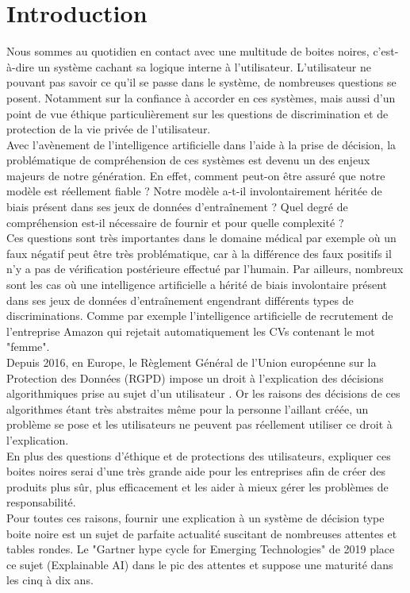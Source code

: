 \chapter*{Introduction}
\label{chap:introduction}
\vspace{5mm}
Nous sommes au quotidien en contact avec une multitude de boites noires, c’est-à-dire un système cachant sa logique interne à l’utilisateur. L’utilisateur ne pouvant pas savoir ce qu’il se passe dans le système, de nombreuses questions se posent. Notamment sur la confiance à accorder en ces systèmes, mais aussi d’un point de vue éthique particulièrement sur les questions de discrimination et de protection de la vie privée de l’utilisateur.\\

Avec l’avènement de l’intelligence artificielle dans l’aide à la prise de décision, la problématique de compréhension de ces systèmes est devenu un des enjeux majeurs de notre génération. En effet, comment peut-on être assuré que notre modèle est réellement fiable ? Notre modèle a-t-il involontairement héritée de biais présent dans ses jeux de données d'entraînement ? Quel degré de compréhension est-il nécessaire de fournir et pour quelle complexité ?\\
Ces questions sont très importantes dans le domaine médical par exemple où un faux négatif peut être très problématique, car à la différence des faux positifs il n'y a pas de vérification postérieure effectué par l'humain. Par ailleurs, nombreux sont les cas où une intelligence artificielle a hérité de biais involontaire présent dans ses jeux de données d'entraînement engendrant différents types de discriminations. Comme par exemple l'intelligence artificielle de recrutement de l'entreprise Amazon qui rejetait automatiquement les CVs contenant le mot "femme"\cite{amazonAi}.\\

Depuis 2016, en Europe, le Règlement Général de l'Union européenne sur la Protection des Données (RGPD) impose un droit à l'explication des décisions algorithmiques prise au sujet d'un utilisateur \cite{RGPDexplanRight}. Or les raisons des décisions de ces algorithmes étant très abstraites même pour la personne l'aillant créée, un problème se pose et les utilisateurs ne peuvent pas réellement utiliser ce droit à l'explication.\\

En plus des questions d'éthique et de protections des utilisateurs, expliquer ces boites noires serai d'une très grande aide pour les entreprises afin de créer des produits plus sûr, plus efficacement et les aider à mieux gérer les problèmes de responsabilité.\\
Pour toutes ces raisons, fournir une explication à un système de décision type boite noire est un sujet de parfaite actualité suscitant de nombreuses attentes et tables rondes. Le "Gartner hype cycle for Emerging Technologies" de 2019 place ce sujet (Explainable AI) dans le pic des attentes et suppose une maturité dans les cinq à dix ans.\\ 

